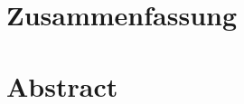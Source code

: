 \ifkitHatZusammenfassung
  \chapter*{Zusammenfassung}
  \thispagestyle{plain}
  \begin{otherlanguage}{ngerman}
  
  \end{otherlanguage}
  \cleardoublepage
\fi
\ifkitHatAbstract
  \chapter*{Abstract}
  \thispagestyle{plain}
  \begin{otherlanguage}{english}
  
  \end{otherlanguage}
  \cleardoublepage
\fi
